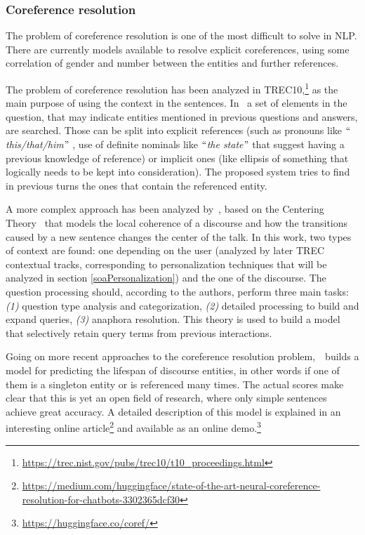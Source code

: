 \subsubsection{Coreference resolution}
\label{soaCoreference}

The problem of coreference resolution is one of the most difficult to solve in NLP. There are currently models available to resolve explicit coreferences, using some correlation of gender and number between the entities and further references.

The problem of coreference resolution has been analyzed in TREC10,\footnote{\url{https://trec.nist.gov/pubs/trec10/t10\_proceedings.html}} as the main purpose of using the context in the sentences. In~\cite{harabagiu2001answering} a set of elements in the question, that may indicate entities mentioned in previous questions and answers, are searched. Those can be split into explicit references (such as pronouns like $``$\textit{this/that/him}$"$ , use of definite nominals like $``$\textit{the state}$"$  that suggest having a previous knowledge of reference) or implicit ones (like ellipsis of something that logically needs to be kept into consideration). The proposed system tries to find in previous turns the ones that contain the referenced entity.

A more complex approach has been analyzed by~\cite{sun2007discourse}, based on the Centering Theory~\cite{grosz1995centering} that models the local coherence of a discourse and how the transitions caused by a new sentence changes the center of the talk. In this work, two types of context are found: one depending on the user (analyzed by later TREC contextual tracks, corresponding to personalization techniques that will be analyzed in section \ref{soaPersonalization}) and the one of the discourse. The question processing should, according to the authors, perform three main tasks: \textit{(1)} question type analysis and categorization, \textit{(2)} detailed processing to build and expand queries, \textit{(3)} anaphora resolution. This theory is used to build a model that selectively retain query terms from previous interactions.

Going on more recent approaches to the coreference resolution problem,~\cite{de2015modeling}\ builds a model  for predicting the lifespan of discourse entities, in other words if one of them is a singleton entity or is referenced many times. The actual scores make clear that this is yet an open field of research, where only simple sentences achieve great accuracy. A detailed description of this model is explained in an interesting online article\footnote{\url{https://medium.com/huggingface/state-of-the-art-neural-coreference-resolution-for-chatbots-3302365dcf30}} and available as an online demo.\footnote{\url{https://huggingface.co/coref/}}

